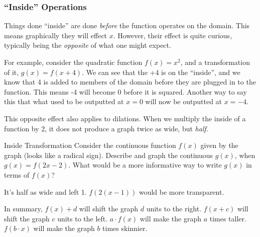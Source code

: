 \subsubsection{``Inside'' Operations}
Things done ``inside'' are done \emph{before} the function operates on the domain.  This means
graphically they will effect $x$.  However, their effect is quite curious, typically being the 
\emph{opposite} of what one might expect.

For example, consider the quadratic function $f(x)=x^2$, and a transformation of it, $g(x)=f(x+4)$.
We can see that the +4 is on the ``inside'', and we know that 4 is added to members of the domain
before they are plugged in to the function.  This means -4 will become 0 before it is squared.
Another way to say this that what used to be outputted at $x=0$ will now be outputted at $x=-4$.

This opposite effect also applies to dilations.  When we multiply the inside of a function by 2, it does
not produce a graph twice as wide, but \emph{half}.

\begin{example}{Inside Transformation}
	\exProblem
Consider the continuous function $f(x)$ given by the graph (looks like a radical sign).
Describe and graph the continuous $g(x)$, when $g(x)=f(2x-2)$.  What would be a more
informative way to write $g(x)$ in terms of $f(x)$?

	\exSolution
It's half as wide and left 1.  $f(2(x-1))$ would be more transparent.
\end{example}

In summary, $f(x) + d$ will shift the graph $d$ units to the right.  $f(x+c)$ will shift the graph
$c$ units to the left.  $a\cdot{}f(x)$ will make the graph $a$ times taller.  $f(b\cdot{}x)$ will
make the graph $b$ times skinnier.

~\vfill
